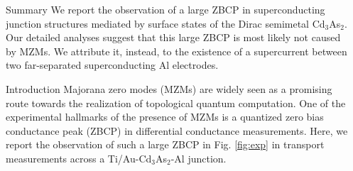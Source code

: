 \documentclass[final]{beamer}
\newlength{\sepwid}
\newlength{\onecolwid}
\begin{document}
\begin{frame}[t] %

\begin{columns}[t] %

\begin{column}{\sepwid}\end{column} %

\begin{column}{\onecolwid} %


\begin{alertblock}{Summary}
We report the observation of a large ZBCP in superconducting junction structures mediated by 
surface states of the Dirac semimetal Cd$_3$As$_2$. Our detailed analyses
suggest that this large ZBCP is most likely not caused by MZMs. We attribute it,
instead, to the existence of a supercurrent between two far-separated
superconducting Al electrodes.
\end{alertblock}


\begin{block}{Introduction}
	Majorana zero modes (MZMs) are widely seen as a promising
	route towards the realization of topological quantum computation. One of
	the experimental hallmarks of the presence of MZMs is 
	a quantized zero bias conductance peak (ZBCP) in differential
	conductance measurements. Here, we report the observation of such a large
	ZBCP in Fig. \ref{fig:exp} in transport measurements across a
	Ti/Au-Cd$_3$As$_2$-Al junction.



\end{block}
\end{column}
\end{columns}
\end{frame}
\end{document}
